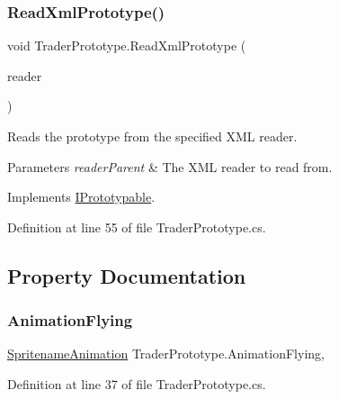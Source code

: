 \subsubsection{\texorpdfstring{Read\+Xml\+Prototype()}{ReadXmlPrototype()}}
{\footnotesize\ttfamily void Trader\+Prototype.\+Read\+Xml\+Prototype (\begin{DoxyParamCaption}\item[{Xml\+Reader}]{reader }\end{DoxyParamCaption})}



Reads the prototype from the specified X\+ML reader. 


\begin{DoxyParams}{Parameters}
{\em reader\+Parent} & The X\+ML reader to read from.\\
\hline
\end{DoxyParams}


Implements \hyperlink{interface_i_prototypable_a024d752c4be655a7166db5718f1fad6a}{I\+Prototypable}.



Definition at line 55 of file Trader\+Prototype.\+cs.



\subsection{Property Documentation}
\mbox{\label{class_trader_prototype_a2a412bcfc58980d6c862bf4d46bf8fa9}} 
\subsubsection{\texorpdfstring{Animation\+Flying}{AnimationFlying}}
{\footnotesize\ttfamily \hyperlink{class_animation_1_1_spritename_animation}{Spritename\+Animation} Trader\+Prototype.\+Animation\+Flying\hspace{0.3cm}{\ttfamily [get]}, {\ttfamily [set]}}



Definition at line 37 of file Trader\+Prototype.\+cs.

\mbox{\label{class_trader_prototype_ab93ef3072e1273b6aecacff9c5afa9c5}} 
